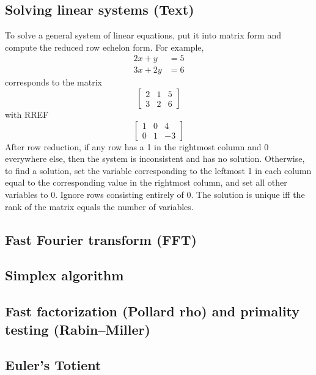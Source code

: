 \documentclass[9pt]{extarticle}
\begin{document}
\begin{multicols*}{3}
\subsection{Solving linear systems (Text)} %
To solve a general system of linear equations, put it into matrix form and
compute the reduced row echelon form. For example,
\begin{align*}2x + y &= 5 \\ 3x + 2y &= 6\end{align*}
corresponds to the matrix
\[ \left[ \begin{array}{cc|c} 2 & 1 & 5 \\ 3 & 2 & 6 \end{array} \right] \]
with RREF
\[ \left[ \begin{array}{cc|c} 1 & 0 & 4 \\ 0 & 1 & -3 \end{array} \right] \]
After row reduction, if any row has a 1 in the rightmost column and 0
everywhere else, then the system is inconsistent and has no solution.
Otherwise, to find a solution, set the variable corresponding to the leftmost 1
in each column equal to the corresponding value in the rightmost column, and
set all other variables to 0. Ignore rows consisting entirely of 0. The
solution is unique iff the rank of the matrix equals the number of variables.

\subsection{Fast Fourier transform (FFT)} %


\subsection{Simplex algorithm} %


\subsection{Fast factorization (Pollard rho) and primality testing
(Rabin--Miller)} %


\subsection{Euler's Totient} %



\end{multicols*}
\end{document}
